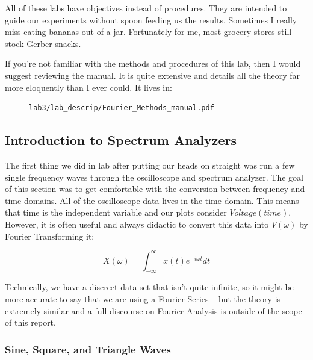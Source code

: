 \documentclass{article}
\begin{document}
All of these labs have objectives instead of procedures. They are intended to
guide our experiments without spoon feeding us the results. Sometimes I really
miss eating bananas out of a jar. Fortunately for me, most grocery stores still
stock Gerber snacks. 

If you're not familiar with the methods and procedures of this lab, then I
would suggest reviewing the manual. It is quite extensive and details all the
theory far more eloquently than I ever could. It lives in:

\begin{figure}[H]
\centering
\begin{minipage}{.8\textwidth}
\begin{tcolorbox}
\begin{verbatim}
lab3/lab_descrip/Fourier_Methods_manual.pdf
\end{verbatim}
\end{tcolorbox}
\end{minipage}
\end{figure}

\subsection{Introduction to Spectrum Analyzers}

The first thing we did in lab after putting our heads on straight was run a few
single frequency waves through the oscilloscope and spectrum analyzer. The goal
of this section was to get comfortable with the conversion between frequency
and time domains. All of the oscilloscope data lives in the time domain.
This means that time is the independent variable and our plots consider
$Voltage(time)$. However, it is often useful and always didactic to convert
this data into $V(\omega)$ by Fourier Transforming it:

\begin{equation}
    X(\omega) = \int_{-\infty}^{\infty} x(t) e^{-i \omega t} dt
\end{equation}

Technically, we have a discreet data set that isn't quite infinite, so it might
be more accurate to say that we are using a Fourier Series -- but the theory is
extremely similar and a full discourse on Fourier Analysis is outside of the
scope of this report.
\subsubsection{Sine, Square, and Triangle Waves}%
\label{ssub:sine_square_and_triangle_waves}
\end{document}
